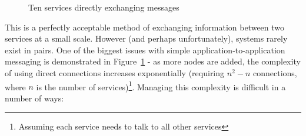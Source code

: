 \begin{figure}[htbp]
  \centering
  
  \caption{Ten services directly exchanging messages}
  \label{fig:tikz:complexDirectMessaging}
\end{figure}

This is a perfectly acceptable method of exchanging information between two
services at a small scale. However (and perhaps unfortunately), systems rarely
exist in pairs. One of the biggest issues with simple application-to-application
messaging is demonstrated in Figure~\ref{fig:tikz:complexDirectMessaging} - as
more nodes are added, the complexity of using direct connections increases
exponentially (requiring $n^2 - n$ connections, where $n$ is the number of
services)\footnote{Assuming each service needs to talk to all other services}.
Managing this complexity is difficult in a number of ways:

